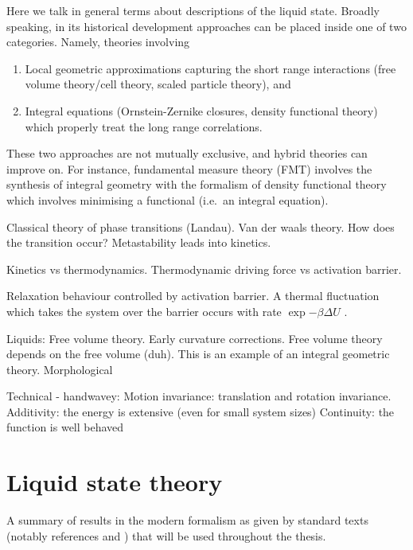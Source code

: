 
Here we talk in general terms about descriptions of the liquid state.
Broadly speaking, in its historical development approaches can be placed inside one of two categories.
Namely, theories involving
\begin{enumerate}
  \item Local geometric approximations capturing the short range interactions (free volume theory/cell theory, scaled particle theory), and
  \item Integral equations (Ornstein-Zernike closures, density functional theory) which properly treat the long range correlations.
\end{enumerate}
These two approaches are not mutually exclusive, and hybrid theories can improve on.
For instance, fundamental measure theory (FMT) involves the synthesis of integral geometry with the formalism of density functional theory which involves minimising a functional (i.e.\ an integral equation).

Classical theory of phase transitions (Landau).
Van der waals theory.
How does the transition occur?
Metastability leads into kinetics.

Kinetics vs thermodynamics.
Thermodynamic driving force vs activation barrier.

Relaxation behaviour controlled by activation barrier.
A thermal fluctuation which takes the system over the barrier%
occurs with rate $\exp{-\beta \Delta U}$ \cite{Langer}.

Liquids:
Free volume theory.
Early curvature corrections.
Free volume theory depends on the free volume (duh).
This is an example of an integral geometric theory.
Morphological 

Technical - handwavey:
Motion invariance: translation and rotation invariance.
Additivity: the energy is extensive (even for small system sizes)
Continuity: the function is well behaved

\section{Liquid state theory}
A summary of results in the modern formalism as given by standard texts (notably references \cite{Hansen2013} and \cite{Santos2016}) that will be used throughout the thesis.

